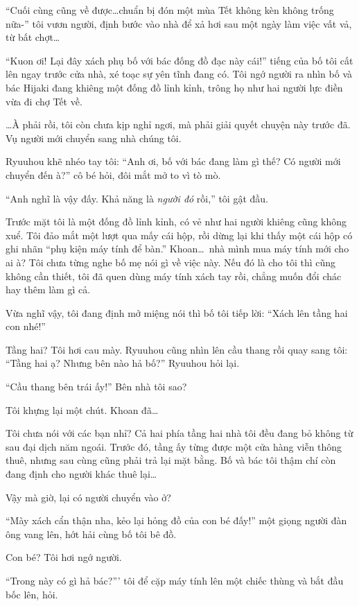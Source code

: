 \documentclass[../main.tex]{subfiles}
\begin{document}
``Cuối cùng cũng về được\dots chuẩn bị đón một mùa Tết không kèn không trống nữa-'' tôi vươn người, định bước vào nhà để xả hơi sau một ngày làm việc vất vả, từ bất chợt\dots

``Kuon ơi! Lại đây xách phụ bố với bác đống đồ đạc này cái!'' tiếng của bố tôi cất lên ngay trước cửa nhà, xé toạc sự yên tĩnh đang có. Tôi ngớ người ra nhìn bố và bác Hijaki đang khiêng một đống đồ lỉnh kỉnh, trông họ như hai người lực điền vừa đi chợ Tết về.

\dots À phải rồi, tôi còn chưa kịp nghỉ ngơi, mà phải giải quyết chuyện này trước đã. Vụ người mới chuyển sang nhà chúng tôi.

Ryuuhou khẽ nhéo tay tôi: ``Anh ơi, bố với bác đang làm gì thế? Có người mới chuyển đến à?'' cô bé hỏi, đôi mắt mở to vì tò mò.

``Anh nghĩ là vậy đấy. Khả năng là \emph{người đó} rồi,'' tôi gật đầu.

Trước mặt tôi là một đống đồ lỉnh kỉnh, có vẻ như hai người khiêng cũng không xuể. Tôi đảo mắt một lượt qua mấy cái hộp, rồi dừng lại khi thấy một cái hộp có ghi nhãn ``phụ kiện máy tính để bàn.'' Khoan\dots\ nhà mình mua máy tính mới cho ai à? Tôi chưa từng nghe bố mẹ nói gì về việc này. Nếu đó là cho tôi thì cũng không cần thiết, tôi đã quen dùng máy tính xách tay rồi, chẳng muốn đổi chác hay thêm làm gì cả.

Vừa nghĩ vậy, tôi đang định mở miệng nói thì bố tôi tiếp lời: ``Xách lên tầng hai con nhé!''

Tầng hai? Tôi hơi cau mày. Ryuuhou cũng nhìn lên cầu thang rồi quay sang tôi: ``Tầng hai ạ? Nhưng bên nào hả bố?'' Ryuuhou hỏi lại.

``Cầu thang bên trái ấy!'' Bên nhà tôi sao?

Tôi khựng lại một chút. Khoan đã\dots

Tôi chưa nói với các bạn nhỉ? Cả hai phía tầng hai nhà tôi đều đang bỏ không từ sau đại dịch năm ngoái. Trước đó, tầng ấy từng được một cửa hàng viễn thông thuê, nhưng sau cùng cũng phải trả lại mặt bằng. Bố và bác tôi thậm chí còn đang định cho người khác thuê lại\dots

Vậy mà giờ, lại có người chuyển vào ở?

``Mày xách cẩn thận nha, kẻo lại hỏng đồ của con bé đấy!'' một giọng người đàn ông vang lên, hớt hải cùng bố tôi bê đồ.

Con bé? Tôi hơi ngớ người.

``Trong này có gì hả bác?''' tôi để cặp máy tính lên một chiếc thùng và bắt đầu bốc lên, hỏi.
\end{document}
